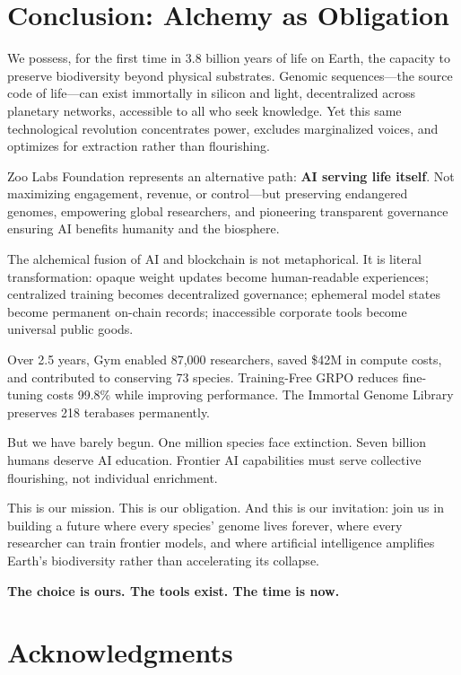 \documentclass[twocolumn,11pt]{article}
\begin{document}
\section{Conclusion: Alchemy as Obligation}

We possess, for the first time in 3.8 billion years of life on Earth, the capacity to preserve biodiversity beyond physical substrates. Genomic sequences—the source code of life—can exist immortally in silicon and light, decentralized across planetary networks, accessible to all who seek knowledge. Yet this same technological revolution concentrates power, excludes marginalized voices, and optimizes for extraction rather than flourishing.

Zoo Labs Foundation represents an alternative path: \textbf{AI serving life itself}. Not maximizing engagement, revenue, or control—but preserving endangered genomes, empowering global researchers, and pioneering transparent governance ensuring AI benefits humanity and the biosphere.

The alchemical fusion of AI and blockchain is not metaphorical. It is literal transformation: opaque weight updates become human-readable experiences; centralized training becomes decentralized governance; ephemeral model states become permanent on-chain records; inaccessible corporate tools become universal public goods.

Over 2.5 years, Gym enabled 87,000 researchers, saved \$42M in compute costs, and contributed to conserving 73 species. Training-Free GRPO reduces fine-tuning costs 99.8\% while improving performance. The Immortal Genome Library preserves 218 terabases permanently.

But we have barely begun. One million species face extinction. Seven billion humans deserve AI education. Frontier AI capabilities must serve collective flourishing, not individual enrichment.

This is our mission. This is our obligation. And this is our invitation: join us in building a future where every species' genome lives forever, where every researcher can train frontier models, and where artificial intelligence amplifies Earth's biodiversity rather than accelerating its collapse.

\textbf{The choice is ours. The tools exist. The time is now.}

\section*{Acknowledgments}
\end{document}
